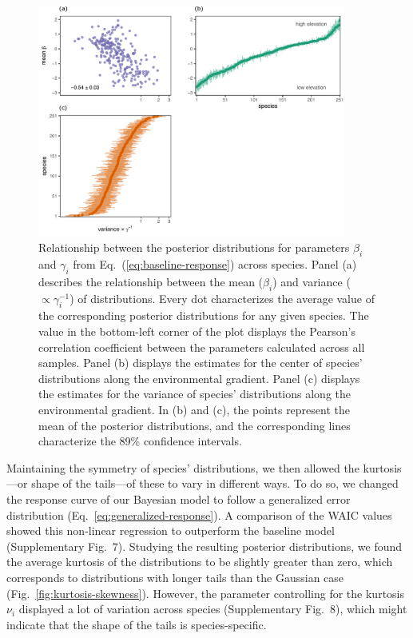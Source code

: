 \documentclass[11pt, a4paper]{article}
\begin{document}
\begin{figure}[h]
  \centering
    \includegraphics[width=0.9\textwidth]{figures/figure1-prime}
    	  \vspace{0.1cm}
	   \caption{Relationship between the posterior distributions for parameters $\beta_i$ and $\gamma_i$ from Eq.~(\ref{eq:baseline-response}) across species. Panel (a) describes the relationship between the mean ($\beta_i$) and variance ($\propto\gamma_i^{-1}$) of distributions. Every dot characterizes the average value of the corresponding posterior distributions for any given species. The value in the bottom-left corner of the plot displays the Pearson's correlation coefficient between the parameters calculated across all samples. Panel (b) displays the estimates for the center of species' distributions along the environmental gradient. Panel (c) displays the estimates for the variance of species' distributions along the environmental gradient. In (b) and (c), the points represent the mean of the posterior distributions, and the corresponding lines characterize the 89\% confidence intervals.}
      \label{fig:correlation}
\end{figure}

Maintaining the symmetry of species' distributions, we then allowed the kurtosis---or shape of the tails---of these to vary in different ways. To do so, we changed the response curve of our Bayesian model to follow a generalized error distribution (Eq.~\ref{eq:generalized-response}). A comparison of the WAIC values showed this non-linear regression to outperform the baseline model (Supplementary Fig.~7). Studying the resulting posterior distributions, we found the average kurtosis of the distributions to be slightly greater than zero, which corresponds to distributions with longer tails than the Gaussian case (Fig.~\ref{fig:kurtosis-skewness}). However, the parameter controlling for the kurtosis $\nu_i$ displayed a lot of variation across species (Supplementary Fig.~8), which might indicate that the shape of the tails is species-specific. 
\end{document}
